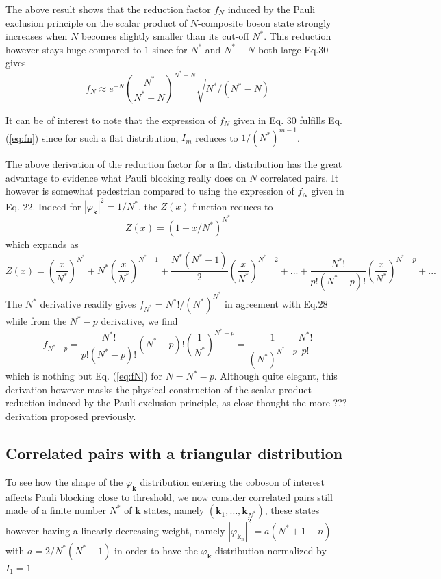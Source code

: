 \documentclass[aps,prb,preprint,groupedaddress,amsmath]{revtex4-1}
\newcommand{\vk}{\ensuremath{\mathbf{k}}}
\begin{document}
 The above result shows that the reduction factor $f_N$ induced by the Pauli exclusion principle on the scalar product of $N$-composite boson state strongly increases when $N$ becomes slightly smaller than its cut-off  $N^*$. This reduction however stays huge compared to $1$ since for $N^*$ and $N^*-N$ both large Eq.30 gives
  \begin{equation}
f_{N}\approx{}e^{-N}(\frac{N^*}{N^*-N{}})^{N^*-N}\sqrt{{N^*/(N^*-N)}}
\end{equation}


It can be of interest to note that the expression of $f_N$ given in Eq. 30 fulfills Eq. (\ref{eq:fn}) since for such a flat distribution, $I_m$ reduces to $1/(N^*)^{m-1}$.

The above derivation of the reduction factor for a flat distribution has the great advantage to evidence what Pauli blocking really does on $N$ correlated pairs. It however is somewhat pedestrian compared to using the expression of $f_N$ given in Eq. 22. Indeed for $|\varphi_\vk|^2=1/N^*$, the $Z(x)$ function reduces to 
\begin{equation}
Z(x)=(1+x/N^*)^{N^*}
\end{equation}
which expands as
\begin{equation}
Z(x)=(\frac{x}{N^*})^{N^*}+N^*(\frac{x}{N^*})^{N^*-1}+\frac{N^*(N^*-1)}{2}(\frac{x}{N^*})^{N^*-2}+...+\frac{N^*!}{p!(N^*-p)!}(\frac{x}{N^*})^{N^*-p}+...
\end{equation}
The $N^*$ derivative readily gives $f_{N^*}=N^*!/(N^*)^{N^*}$ in agreement with Eq.28 while from the $N^*-p$ derivative, we find
\begin{equation}
f_{N^*-p}=\frac{N^*!}{p!(N^*-p)!}(N^*-p)!(\frac{1}{N^*})^{N^*-p}
=\frac{1}{(N^*)^{N^*-p}}\frac{N^*!}{p!}
\end{equation}
which is nothing but Eq. (\ref{eq:fN}) for $N=N^*-p$. Although quite elegant, this derivation however masks the physical construction of the scalar product reduction induced by the Pauli exclusion principle, as close thought the more ??? derivation proposed previously.






\subsection{Correlated pairs with a triangular distribution}
To see how the shape of the $\varphi_{\vk}$ distribution entering the coboson of interest affects Pauli blocking close to threshold, we now consider correlated pairs still made of a finite number $N^*$ of $\vk$ states, namely $(\vk_1,\dots,\vk_{N^*})$, these states however having a linearly decreasing weight, namely $|\varphi_{\vk_n}|^2=a(N^*+1-n)$ with $a=2/N^*(N^*+1)$ in order to have the $\varphi_{\vk}$ distribution normalized by $I_1=1$
\end{document}
